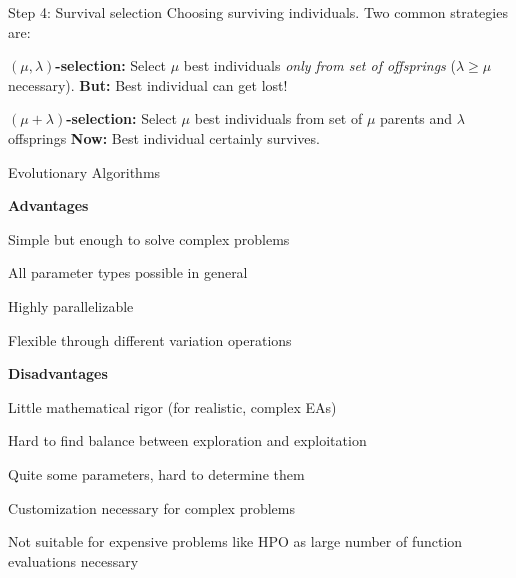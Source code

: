 \documentclass[11pt,compress,t,notes=noshow, xcolor=table]{beamer}
\begin{document}
\begin{framev}{Step 4: Survival selection}
Choosing surviving individuals.
Two common strategies are:
\spacer
\begin{itemizeL}
\item \textbf{$(\mu, \lambda)$-selection:}
Select $\mu$ best individuals \textit{only from set of offsprings} ($\lambda \ge \mu$ necessary).
\textbf{But:} Best individual can get lost!
\item \textbf{$(\mu + \lambda)$-selection:}
Select $\mu$ best individuals from set of $\mu$ parents and $\lambda$ offsprings
\textbf{Now:} Best individual certainly survives.
\end{itemizeL}
\end{framev}


\begin{framei}{Evolutionary Algorithms}
\item \textbf{Advantages}
\item Simple but enough to solve complex problems
\item All parameter types possible in general
\item Highly parallelizable
\item Flexible through different variation operations
\spacer
\item \textbf{Disadvantages}
\item Little mathematical rigor (for realistic, complex EAs)
\item Hard to find balance between exploration and exploitation
\item Quite some parameters, hard to determine them
\item Customization necessary for complex problems
\item Not suitable for expensive problems like HPO as large number of function evaluations necessary
\end{framei}

\endlecture
\end{document}
